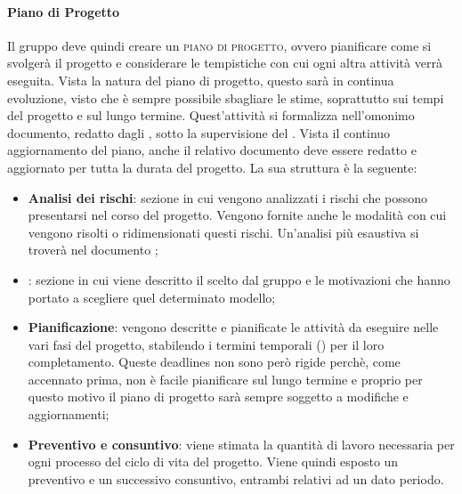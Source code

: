 \documentclass[../norme_di_progetto.tex]{subfiles}
\begin{document}
\paragraph{Piano di Progetto}
Il gruppo deve quindi creare un \textsc{piano di progetto}, ovvero pianificare come si svolgerà il progetto e considerare le tempistiche con cui ogni altra attività verrà eseguita. Vista la natura del piano di progetto, questo sarà in continua evoluzione, visto che è sempre possibile sbagliare le stime, soprattutto sui tempi del progetto e sul lungo termine. Quest'attività si formalizza nell'omonimo documento, redatto dagli \emph{}, sotto la supervisione del . Vista il continuo aggiornamento del piano, anche il relativo documento deve essere redatto e aggiornato per tutta la durata del progetto. La sua struttura è la seguente:
\begin{itemize}
    \item \textbf{Analisi dei rischi}: sezione in cui vengono analizzati i rischi che possono presentarsi nel corso del progetto. Vengono fornite anche le modalità con cui vengono risolti o ridimensionati questi rischi. Un'analisi più esaustiva si troverà nel documento ;
    \item {}: sezione in cui viene descritto il  scelto dal gruppo e le motivazioni che hanno portato a scegliere quel determinato modello;
    \item \textbf{Pianificazione}: vengono descritte e pianificate le attività da eseguire nelle vari fasi del progetto, stabilendo i termini temporali () per il loro completamento. Queste deadlines non sono però rigide perchè, come accennato prima, non è facile pianificare sul lungo termine e proprio per questo motivo il piano di progetto sarà sempre soggetto a modifiche e aggiornamenti;
    \item \textbf{Preventivo e consuntivo}: viene stimata la quantità di lavoro necessaria per ogni processo del ciclo di vita del progetto. Viene quindi esposto un preventivo e un successivo consuntivo, entrambi relativi ad un dato periodo.
\end{itemize}
\end{document}
